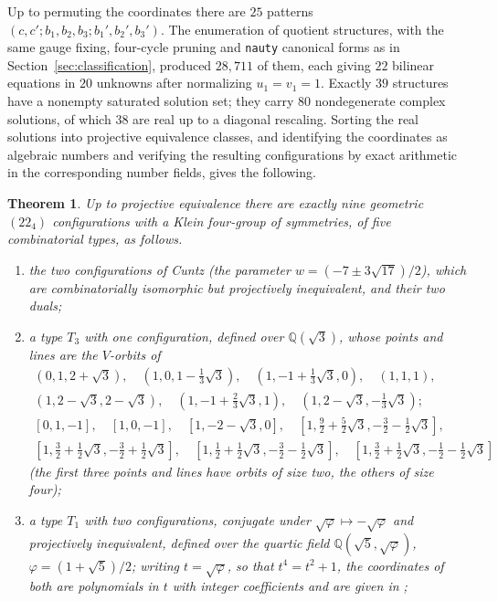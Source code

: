 \documentclass[11pt]{article}
\theoremstyle{plain}
\newtheorem{theorem}{Theorem}
\theoremstyle{definition}
\newcommand{\QQ}{\mathbb{Q}}
\begin{document}
Up to permuting the coordinates there are $25$ patterns $(c,c';b_1,b_2,b_3;b_1',b_2',b_3')$.  The enumeration of quotient structures, with the same gauge fixing, four-cycle pruning and \texttt{nauty} canonical forms as in Section~\ref{sec:classification}, produced $28{,}711$ of them, each giving $22$ bilinear equations in $20$ unknowns after normalizing $u_1=v_1=1$.  Exactly $39$ structures have a nonempty saturated solution set; they carry $80$ nondegenerate complex solutions, of which $38$ are real up to a diagonal rescaling.  Sorting the real solutions into projective equivalence classes, and identifying the coordinates as algebraic numbers and verifying the resulting configurations by exact arithmetic in the corresponding number fields, gives the following.

\begin{theorem}\label{thm:22}
Up to projective equivalence there are exactly nine geometric $(22_4)$ configurations with a Klein four-group of symmetries, of five combinatorial types, as follows.
\begin{enumerate}
\item[(i)] the two configurations of Cuntz \cite{Cun18} (the parameter $w=(-7\pm3\sqrt{17})/2$), which are combinatorially isomorphic but projectively inequivalent, and their two duals;
\item[(ii)] a type $T_3$ with one configuration, defined over $\QQ(\sqrt3)$, whose points and lines are the $V$-orbits of
\begin{equation}\label{eq:T3}
\begin{gathered}
(0,1,2{+}\sqrt3),\quad (1,0,1{-}\tfrac13\sqrt3),\quad (1,-1{+}\tfrac13\sqrt3,0),\quad (1,1,1),\\
(1,2{-}\sqrt3,2{-}\sqrt3),\quad (1,-1{+}\tfrac23\sqrt3,1),\quad (1,2{-}\sqrt3,-\tfrac13\sqrt3);\\[2pt]
[0,1,-1],\quad [1,0,-1],\quad [1,-2{-}\sqrt3,0],\quad [1,\tfrac92{+}\tfrac52\sqrt3,-\tfrac32{-}\tfrac12\sqrt3],\\
[1,\tfrac32{+}\tfrac12\sqrt3,-\tfrac32{+}\tfrac12\sqrt3],\quad [1,\tfrac12{+}\tfrac12\sqrt3,-\tfrac32{-}\tfrac12\sqrt3],\quad [1,\tfrac32{+}\tfrac12\sqrt3,-\tfrac12{-}\tfrac12\sqrt3]
\end{gathered}
\end{equation}
(the first three points and lines have orbits of size two, the others of size four);
\item[(iii)] a type $T_1$ with two configurations, conjugate under $\sqrt\varphi\mapsto-\sqrt\varphi$ and projectively inequivalent, defined over the quartic field $\QQ(\sqrt5,\sqrt\varphi)$, $\varphi=(1+\sqrt5)/2$;  writing $t=\sqrt\varphi$, so that $t^4=t^2+1$, the coordinates of both are polynomials in $t$ with integer coefficients and are given in \cite{Lu26};

\end{enumerate}
\end{theorem}
\end{document}
